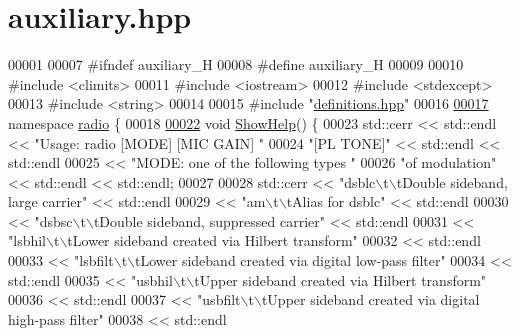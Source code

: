 \hypertarget{auxiliary_8hpp_source}{\section{auxiliary.\+hpp}
\label{auxiliary_8hpp_source}
}

\begin{DoxyCode}
00001 
00007 \textcolor{preprocessor}{#ifndef auxiliary\_H}
00008 \textcolor{preprocessor}{#define auxiliary\_H}
00009 
00010 \textcolor{preprocessor}{#include <climits>}
00011 \textcolor{preprocessor}{#include <iostream>}
00012 \textcolor{preprocessor}{#include <stdexcept>}
00013 \textcolor{preprocessor}{#include <string>}
00014 
00015 \textcolor{preprocessor}{#include "\hyperlink{definitions_8hpp}{definitions.hpp}"}
00016 
\hypertarget{auxiliary_8hpp_source_l00017}{}\hyperlink{namespaceradio}{00017} \textcolor{keyword}{namespace }\hyperlink{namespaceradio}{radio} \{
00018 
\hypertarget{auxiliary_8hpp_source_l00022}{}\hyperlink{namespaceradio_a6db7c682d0f9aeac8cb5042717b8ae7f}{00022}     \textcolor{keywordtype}{void} \hyperlink{namespaceradio_a6db7c682d0f9aeac8cb5042717b8ae7f}{ShowHelp}() \{
00023         std::cerr << std::endl << \textcolor{stringliteral}{"Usage: radio [MODE] [MIC GAIN] "}
00024             \textcolor{stringliteral}{"[PL TONE]"} << std::endl << std::endl
00025             << \textcolor{stringliteral}{"MODE: one of the following types "}
00026             \textcolor{stringliteral}{"of modulation"} << std::endl << std::endl;
00027 
00028         std::cerr << \textcolor{stringliteral}{"dsblc\(\backslash\)t\(\backslash\)tDouble sideband, large carrier"} << std::endl
00029             << \textcolor{stringliteral}{"am\(\backslash\)t\(\backslash\)tAlias for dsblc"} << std::endl
00030             << \textcolor{stringliteral}{"dsbsc\(\backslash\)t\(\backslash\)tDouble sideband, suppressed carrier"} << std::endl
00031             << \textcolor{stringliteral}{"lsbhil\(\backslash\)t\(\backslash\)tLower sideband created via Hilbert transform"}
00032             << std::endl
00033             << \textcolor{stringliteral}{"lsbfilt\(\backslash\)t\(\backslash\)tLower sideband created via digital low-pass filter"}
00034             << std::endl
00035             << \textcolor{stringliteral}{"usbhil\(\backslash\)t\(\backslash\)tUpper sideband created via Hilbert transform"}
00036             << std::endl
00037             << \textcolor{stringliteral}{"usbfilt\(\backslash\)t\(\backslash\)tUpper sideband created via digital high-pass filter"}
00038             << std::endl

\end{DoxyCode}
